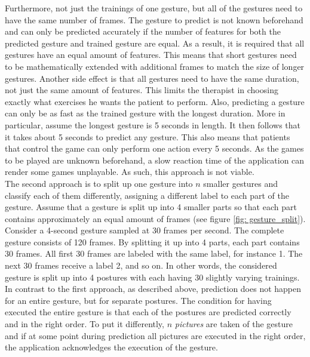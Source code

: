 Furthermore, not just the trainings of one gesture, but all of the gestures need to have the same number of frames. The gesture to predict is not known beforehand and can only be predicted accurately if the number of features for both the predicted gesture and trained gesture are equal. As a result, it is required that all gestures have an equal amount of features. This means that short gestures need to be mathematically extended with additional frames to match the size of longer gestures. Another side effect is that all gestures need to have the same duration, not just the same amount of features. This limits the therapist in choosing exactly what exercises he wants the patient to perform. Also, predicting a gesture can only be as fast as the trained gesture with the longest duration. More in particular, assume the longest gesture is 5 seconds in length. It then follows that it takes about 5 seconds to predict any gesture. This also means that patients that control the game can only perform one action every 5 seconds. As the games to be played are unknown beforehand, a slow reaction time of the application can render some games unplayable. As such, this approach is not viable.\\

The second approach is to split up one gesture into $n$ smaller gestures and classify each of them differently, assigning a different label to each part of the gesture. Assume that a gesture is split up into 4 smaller parts so that each part contains approximately an equal amount of frames (see figure \ref{fig: gesture_split}). Consider a 4-second gesture sampled at 30 frames per second. The complete gesture consists of 120 frames. By splitting it up into 4 parts, each part contains 30 frames. All first 30 frames are labeled with the same label, for instance 1. The next 30 frames receive a label 2, and so on. In other words, the considered gesture is split up into 4 postures with each having 30 slightly varying trainings. In contrast to the first approach, as described above, prediction does not happen for an entire gesture, but for separate postures. The condition for having executed the entire gesture is that each of the postures are predicted correctly and in the right order. To put it differently, $n$ \emph{pictures} are taken of the gesture and if at some point during prediction all pictures are executed in the right order, the application acknowledges the execution of the gesture.\\

